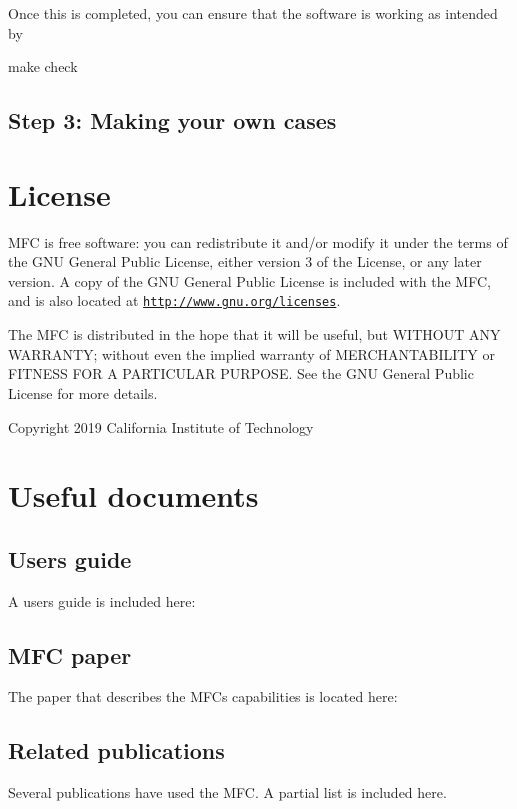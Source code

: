 Once this is completed, you can ensure that the software is working as intended by \begin{DoxyItemize}
\item make check\end{DoxyItemize}
\hypertarget{index_step4}{}\subsection{Step 3\+: Making your own cases}\label{index_step4}
\hypertarget{index_license_sec}{}\section{License}\label{index_license_sec}
M\+FC is free software\+: you can redistribute it and/or modify it under the terms of the G\+NU General Public License, either version 3 of the License, or any later version. A copy of the G\+NU General Public License is included with the M\+FC, and is also located at \href{http://www.gnu.org/licenses}{\tt http\+://www.\+gnu.\+org/licenses}.

The M\+FC is distributed in the hope that it will be useful, but W\+I\+T\+H\+O\+UT A\+NY W\+A\+R\+R\+A\+N\+TY; without even the implied warranty of M\+E\+R\+C\+H\+A\+N\+T\+A\+B\+I\+L\+I\+TY or F\+I\+T\+N\+E\+SS F\+OR A P\+A\+R\+T\+I\+C\+U\+L\+AR P\+U\+R\+P\+O\+SE. See the G\+NU General Public License for more details.

Copyright 2019 California Institute of Technology\hypertarget{index_documents_sec}{}\section{Useful documents}\label{index_documents_sec}
\hypertarget{index_user}{}\subsection{User\textquotesingle{}s guide}\label{index_user}
A user\textquotesingle{}s guide is included here\+:\hypertarget{index_paper}{}\subsection{M\+F\+C paper}\label{index_paper}
The paper that describes the M\+FC\textquotesingle{}s capabilities is located here\+:\hypertarget{index_pub}{}\subsection{Related publications}\label{index_pub}
Several publications have used the M\+FC. A partial list is included here.

